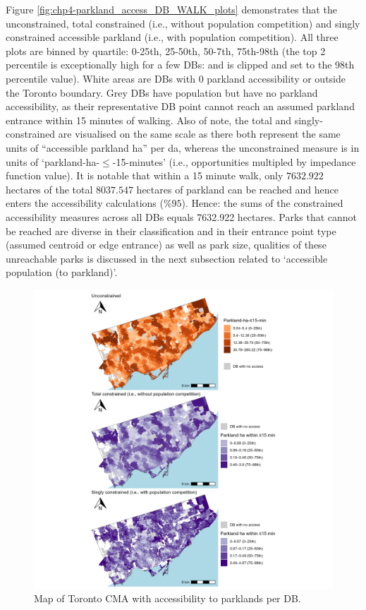 \documentclass[
11pt, %
oneside, %
english, %
singlespacing, %
]{macthesis} %
\begin{document}
Figure \ref{fig:chp4-parkland_access_DB_WALK_plots} demonstrates that the unconstrained, total constrained (i.e., without population competition) and singly constrained accessible parkland (i.e., with population competition). All three plots are binned by quartile: 0-25th, 25-50th, 50-7th, 75th-98th (the top 2 percentile is exceptionally high for a few DBs: and is clipped and set to the 98th percentile value). White areas are DBs with 0 parkland accessibility or outside the Toronto boundary. Grey DBs have population but have no parkland accessibility, as their representative DB point cannot reach an assumed parkland entrance within 15 minutes of walking. Also of note, the total and singly-constrained are visualised on the same scale as there both represent the same units of ``accessible parkland ha'' per da, whereas the unconstrained measure is in units of `parkland-ha-\(\le\)-15-minutes' (i.e., opportunities multipled by impedance function value). It is notable that within a 15 minute walk, only \(7632.922\) hectares of the total \(8037.547\) hectares of parkland can be reached and hence enters the accessibility calculations (\(\%95\)). Hence: the sums of the constrained accessibility measures across all DBs equals 7632.922 hectares. Parks that cannot be reached are diverse in their classification and in their entrance point type (assumed centroid or edge entrance) as well as park size, qualities of these unreachable parks is discussed in the next subsection related to `accessible population (to parkland)'.

\begin{figure}

{\centering \includegraphics[width=6in]{./data/figures/chp4-parkland_access_DB_WALK_plots} 

}

\caption{\label{fig:chp4-parkland_access_DB_WALK_plots}Map of Toronto CMA with accessibility to parklands per DB.}\label{fig:unnamed-chunk-56}
\end{figure}
\end{document}

